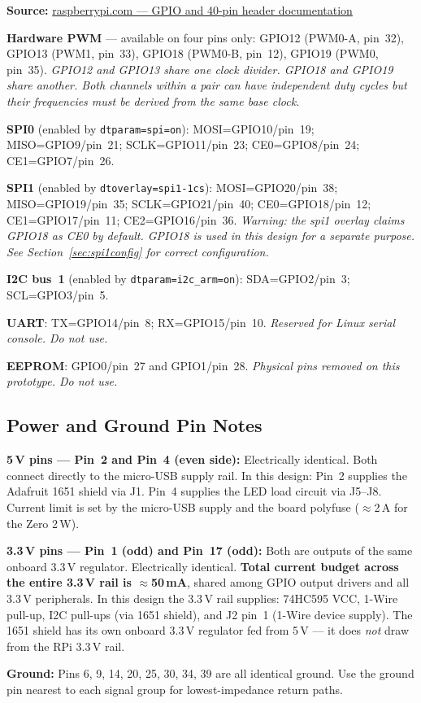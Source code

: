 \documentclass[11pt,a4paper]{article}
\begin{document}
\begin{notebox}
\textbf{Source:}
\href{https://www.raspberrypi.com/documentation/computers/raspberry-pi.html\#gpio}%
{raspberrypi.com --- GPIO and 40-pin header documentation}

\medskip
\textbf{Hardware PWM} --- available on four pins only:
GPIO12 (PWM0-A, pin~32), GPIO13 (PWM1, pin~33),
GPIO18 (PWM0-B, pin~12), GPIO19 (PWM0, pin~35).
\textit{GPIO12 and GPIO13 share one clock divider.
GPIO18 and GPIO19 share another.
Both channels within a pair can have independent duty cycles
but their frequencies must be derived from the same base clock.}

\medskip
\textbf{SPI0} (enabled by \texttt{dtparam=spi=on}):
MOSI=GPIO10/pin~19; MISO=GPIO9/pin~21; SCLK=GPIO11/pin~23;
CE0=GPIO8/pin~24; CE1=GPIO7/pin~26.

\medskip
\textbf{SPI1} (enabled by \texttt{dtoverlay=spi1-1cs}):
MOSI=GPIO20/pin~38; MISO=GPIO19/pin~35; SCLK=GPIO21/pin~40;
CE0=GPIO18/pin~12; CE1=GPIO17/pin~11; CE2=GPIO16/pin~36.
\textit{Warning: the spi1 overlay claims GPIO18 as CE0 by default.
GPIO18 is used in this design for a separate purpose.
See Section~\ref{sec:spi1config} for correct configuration.}

\medskip
\textbf{I2C bus~1} (enabled by \texttt{dtparam=i2c\_arm=on}):
SDA=GPIO2/pin~3; SCL=GPIO3/pin~5.

\medskip
\textbf{UART}:
TX=GPIO14/pin~8; RX=GPIO15/pin~10.
\textit{Reserved for Linux serial console. Do not use.}

\medskip
\textbf{EEPROM}: GPIO0/pin~27 and GPIO1/pin~28.
\textit{Physical pins removed on this prototype. Do not use.}
\end{notebox}

\subsection{Power and Ground Pin Notes}

\begin{warnbox}
\textbf{5\,V pins --- Pin~2 and Pin~4 (even side):}
Electrically identical. Both connect directly to the micro-USB supply rail.
In this design: Pin~2 supplies the Adafruit 1651 shield via J1.
Pin~4 supplies the LED load circuit via J5--J8.
Current limit is set by the micro-USB supply and the board polyfuse
($\approx$2\,A for the Zero 2\,W).

\smallskip
\textbf{3.3\,V pins --- Pin~1 (odd) and Pin~17 (odd):}
Both are outputs of the same onboard 3.3\,V regulator. Electrically identical.
\textbf{Total current budget across the entire 3.3\,V rail is $\approx$50\,mA},
shared among GPIO output drivers and all 3.3\,V peripherals.
In this design the 3.3\,V rail supplies: 74HC595 VCC, 1-Wire pull-up,
I2C pull-ups (via 1651 shield), and J2 pin~1 (1-Wire device supply).
The 1651 shield has its own onboard 3.3\,V regulator fed from 5\,V ---
it does \emph{not} draw from the RPi 3.3\,V rail.

\smallskip
\textbf{Ground:} Pins 6, 9, 14, 20, 25, 30, 34, 39 are all identical ground.
Use the ground pin nearest to each signal group for lowest-impedance return paths.
\end{warnbox}
\end{document}
